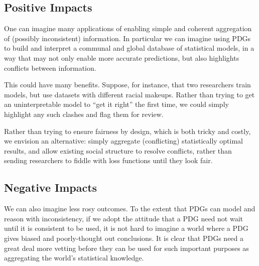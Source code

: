 \documentclass[letterpaper]{article} %
\theoremstyle{plain}
\theoremstyle{definition}
\theoremstyle{remark}
\begin{document}
\subsection{Positive Impacts}
One can imagine many applications of enabling simple and coherent
aggregation of (possibly inconsistent) information. In particular we
can imagine using PDGs to build and interpret a communal and global
database of statistical models, in a way that may not only enable more
accurate predictions, but also highlights conflicts between
information.

This could have many benefits.
Suppose, for instance, that two researchers train models, but use
datasets with
different racial makeups. Rather than trying to get an uninterpretable
model to ``get it right'' the first time, we could simply highlight any
such clashes and flag them for review.

Rather than trying to
ensure fairness by design, which is both tricky and costly,
we envision an alternative: simply 
aggregate (conflicting)
statistically optimal results, and allow existing social structure to resolve conflicts,
rather than sending researchers to fiddle with loss functions until they look fair. 


\subsection{Negative Impacts}

We can also imagine less rosy outcomes. To the extent that PDGs can
model and reason with inconsistency,
if
we adopt the attitude that a PDG need not wait until it is consistent
to be used, it is not hard to imagine a world where a PDG gives biased and
poorly-thought out conclusions.
It is clear that PDGs need a great deal more
vetting before they can be used for such important purposes as
aggregating the world's statistical knowledge.
\end{document}
